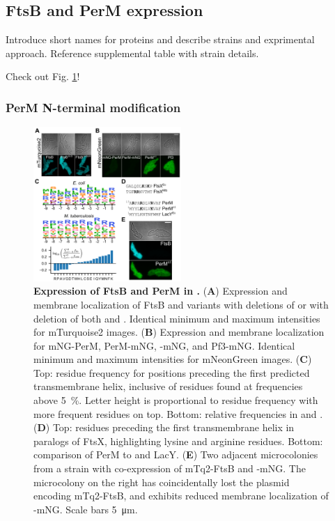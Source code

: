 \documentclass[pdflatex,sn-basic]{sn-jnl}%
\begin{document}
\subsection{FtsB and PerM expression}

Introduce short names for proteins and describe strains and exprimental approach.
Reference supplemental table with strain details.

Check out Fig. \ref{fig2}!

\loremipsum{}

\subsubsection{PerM N-terminal modification}

\loremipsum{}

\begin{figure}[h]
\centering
\includegraphics[width=0.5\textwidth]{../figures/fig2.png}
\caption{\textbf{Expression of \mtb{} FtsB and PerM in \ec{}.} (\textbf{A}) Expression and membrane localization of FtsB and variants with deletions of \ftsbLQ{} or with deletion of both \ftsbLQ{} and \ftsbH{}. Identical minimum and maximum intensities for mTurquoise2 images. (\textbf{B}) Expression and membrane localization for mNG-PerM, PerM-mNG, \permN{}-mNG, and Pf3-mNG. Identical minimum and maximum intensities for mNeonGreen images. (\textbf{C}) Top: residue frequency for positions preceding the first predicted transmembrane helix, inclusive of residues found at frequencies above \qty{5}{\percent}. Letter height is proportional to residue frequency with more frequent residues on top. Bottom: relative frequencies in \ec{} and \mtb{}. (\textbf{D}) Top: residues preceding the first transmembrane helix in paralogs of FtsX, highlighting lysine and arginine residues. Bottom: comparison of PerM to \permN{} and \ec{} LacY. (\textbf{E}) Two adjacent microcolonies from a strain with co-expression of mTq2-FtsB and \permN{}-mNG. The microcolony on the right has coincidentally lost the plasmid encoding mTq2-FtsB, and exhibits reduced membrane localization of \permN{}-mNG. Scale bars \qty{5}{\um}.}\label{fig2}
\end{figure}
\end{document}
